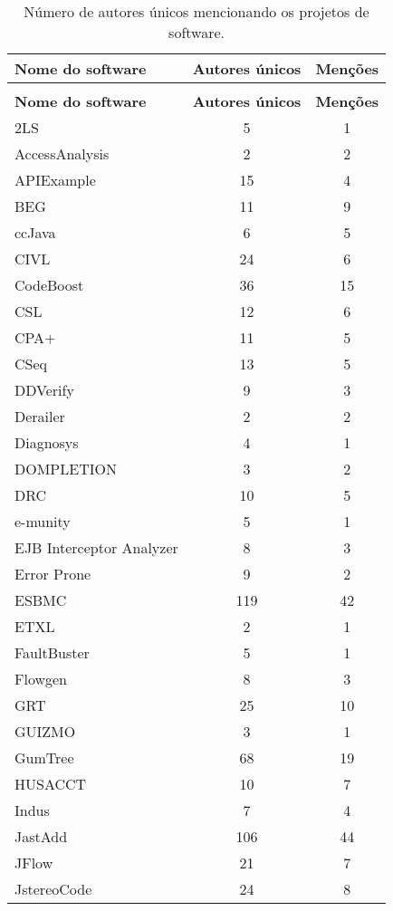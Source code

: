 
\begin{longtable}{ l c c }
\caption{Número de autores únicos mencionando os projetos de software.}
\label{authorship-table} \\
  \hline
  \hhline{ l c c |}
  \endfirsthead
  \hhline{ l c c |}
  \hline
  \textbf{Nome do software} & {\bf Autores únicos} & {\bf Menções} \\
  \hline
  \hhline{ l c c |}
  \endhead
  \hhline{---}
  \multicolumn{3}{c}{continua na próxima página} \\
  \hhline{---} \endfoot
  \hhline{---} \endlastfoot
  \textbf{Nome do software} & {\bf Autores únicos} & {\bf Menções} \\
  \hline
   2LS & 5 & 1 \\
   AccessAnalysis & 2 & 2 \\
   APIExample & 15 & 4 \\
   BEG & 11 & 9 \\
   ccJava & 6 & 5 \\
   CIVL & 24 & 6 \\
   CodeBoost & 36 & 15 \\
   CSL & 12 & 6 \\
   CPA+ & 11 & 5 \\
   CSeq & 13 & 5 \\
   DDVerify & 9 & 3 \\
   Derailer & 2 & 2 \\
   Diagnosys & 4 & 1 \\
   DOMPLETION & 3 & 2 \\
   DRC & 10 & 5 \\
   e-munity & 5 & 1 \\
   EJB Interceptor Analyzer & 8 & 3 \\
   Error Prone & 9 & 2 \\
   ESBMC & 119 & 42 \\
   ETXL & 2 & 1 \\
   FaultBuster & 5 & 1 \\
   Flowgen & 8 & 3 \\
   GRT & 25 & 10 \\
   GUIZMO & 3 & 1 \\
   GumTree & 68 & 19 \\
   HUSACCT & 10 & 7 \\
   Indus & 7 & 4 \\
   JastAdd & 106 & 44 \\
   JFlow & 21 & 7 \\
   JstereoCode & 24 & 8 \\

\end{longtable}

